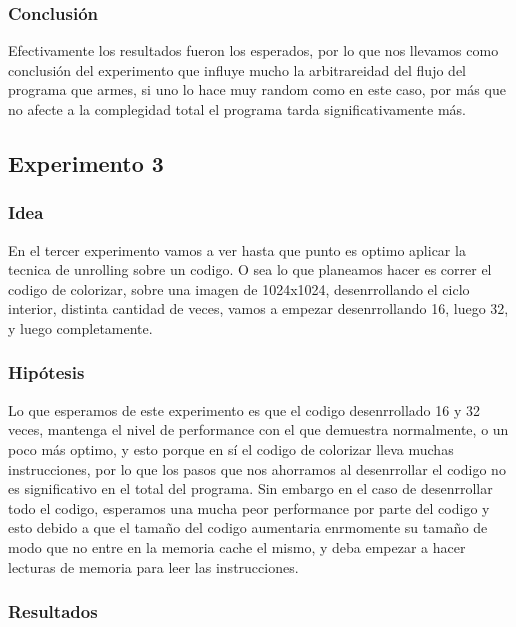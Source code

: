 \medskip

\subsubsection{Conclusión}
\par{Efectivamente los resultados fueron los esperados, por lo que nos llevamos como conclusión del experimento que influye mucho la arbitrareidad del flujo del programa que armes, si uno lo hace muy random como en este caso, por más que no afecte a la complegidad total el programa tarda significativamente más.}

\subsection{Experimento 3}

\subsubsection{Idea}
\par{En el tercer experimento vamos a ver hasta que punto es optimo aplicar la tecnica de unrolling sobre un codigo. O sea lo que planeamos hacer es correr el codigo de colorizar, sobre una imagen de 1024x1024, desenrrollando el ciclo interior, distinta cantidad de veces, vamos a empezar desenrrollando 16, luego 32, y luego completamente.}

	   
\subsubsection{Hipótesis}
\par{Lo que esperamos de este experimento es que el codigo desenrrollado 16 y 32 veces, mantenga el nivel de performance con el que demuestra normalmente, o un poco más optimo, y esto porque en s\'i el codigo de colorizar lleva muchas instrucciones, por lo que los pasos que nos ahorramos al desenrrollar el codigo no es significativo en el total del programa. Sin embargo en el caso de desenrrollar todo el codigo, esperamos una mucha peor performance por parte del codigo y esto debido a que el tamaño del codigo aumentaria enrmomente su tamaño de modo que no entre en la memoria cache el mismo, y deba empezar a hacer lecturas de memoria para leer las instrucciones.}
	
\subsubsection{Resultados}


